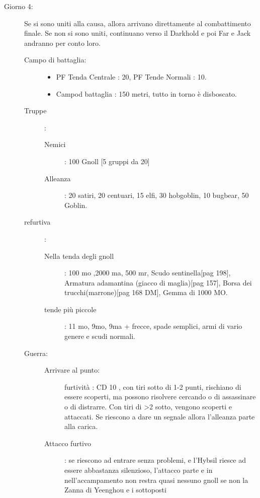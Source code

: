 \documentclass{article}
\begin{document}
\begin{description}
    \item[Giorno 4:] Se si sono uniti alla causa, allora arrivano direttamente al combattimento finale. Se non si sono uniti, continuano verso il Darkhold e poi Far e Jack andranno per conto loro.
        \begin{description}
            \item[Campo di battaglia:]
                    \begin{itemize}
                        \item PF Tenda Centrale : 20, PF Tende Normali : 10.
                        \item Campod battaglia : 150 metri, tutto in torno è disboscato. 
                    \end{itemize}
            \item[Truppe]:
                \begin{description}
                    \item[Nemici]: 100 Gnoll [5 gruppi da 20]
                    \item[Alleanza]: 20 satiri, 20 centuari, 15 elfi, 30 hobgoblin, 10 bugbear, 50 Goblin.    
                \end{description}
            \item[refurtiva]: 
                \begin{description}
                    \item[Nella tenda degli gnoll] : 100 mo ,2000 ma, 500 mr, Scudo sentinella[pag  198], Armatura adamantina (giacco di maglia)[pag 157], Borsa dei trucchi(marrone)[pag 168 DM], Gemma di 1000 MO. 
                    \item[tende più piccole]: 11 mo, 9mo, 9ma + frecce, spade semplici, armi di vario genere e scudi normali. 
                \end{description}
            \item[Guerra:]
                \begin{description}
                    \item[Arrivare al punto:] furtività : CD 10 , con tiri sotto di 1-2 punti, rischiano di essere scoperti, ma possono risolvere cercando o di assassinare o di distrarre. Con tiri di >2 sotto, vengono scoperti e attaccati. Se riescono a dare un segnale allora l'alleanza parte alla carica.
                    \item[Attacco furtivo]: se riescono ad entrare senza problemi, e l'Hybsil riesce ad essere abbastanza silenzioso, l'attacco parte e in nell'accampamento non restra quasi nessuno gnoll se non la Zanna di Yeenghou e i sottoposti   

\end{description}
\end{description}
\end{description}
\end{document}
